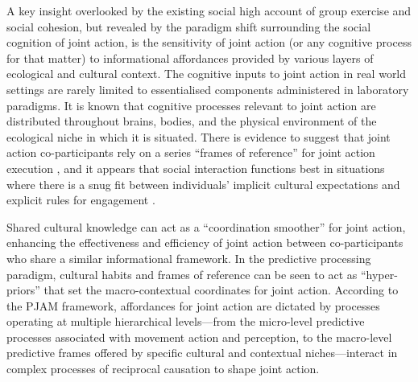 \begin{CJK}{UTF8}{gbsn}
A key insight overlooked by the existing social high account of group exercise and social cohesion, but revealed by the paradigm shift surrounding the social cognition of joint action, is the sensitivity of joint action (or any cognitive process for that matter) to informational affordances provided by various layers of ecological and cultural context.  The cognitive inputs to joint action in real world settings are rarely limited to essentialised components administered in laboratory paradigms. It is known that cognitive processes relevant to joint action are distributed throughout brains, bodies, and the physical environment of the ecological niche in which it is situated.  There is evidence to suggest that joint action co-participants rely on a series ``frames of reference'' for joint action execution \citep{Ray2018}, and it appears that social interaction functions best in situations where there is a snug fit between individuals' implicit cultural expectations and explicit rules for engagement \citep{Vollan2017}.

Shared cultural knowledge can act as a ``coordination smoother'' \citep{Vesper2017} for joint action, enhancing the effectiveness and efficiency of joint action between co-participants who share a similar informational framework.  In the predictive processing paradigm, cultural habits and frames of reference can be seen to act as ``hyper-priors'' that set the macro-contextual coordinates for joint action\citep{Clark2013}.  According to the PJAM framework, affordances for joint action are dictated by processes operating at multiple hierarchical levels---from the micro-level predictive processes associated with movement action and perception, to the macro-level predictive frames offered by specific cultural and contextual niches---interact in complex processes of reciprocal causation to shape joint action.






\end{CJK}
